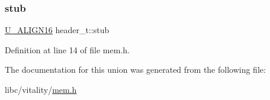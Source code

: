\subsubsection{\texorpdfstring{stub}{stub}}
{\footnotesize\ttfamily \hyperlink{a00140_a9093ff6c6894ca213db42a2d686d0ad6_a9093ff6c6894ca213db42a2d686d0ad6}{U\+\_\+\+A\+L\+I\+G\+N16} header\+\_\+t\+::stub}



Definition at line 14 of file mem.\+h.



The documentation for this union was generated from the following file\+:\begin{DoxyCompactItemize}
\item 
libc/vitality/\hyperlink{a00170}{mem.\+h}\end{DoxyCompactItemize}
